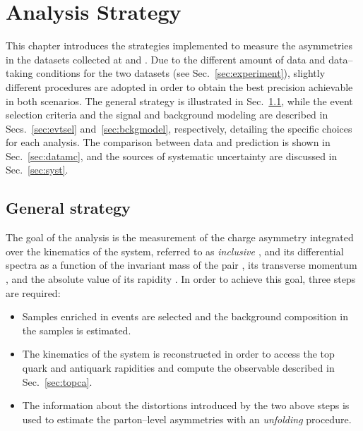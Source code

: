\chapter{Analysis Strategy}
\label{sec:strategy}

This chapter introduces the strategies implemented to measure the
asymmetries in the datasets collected at \seventev{} and \eighttev{}.
Due to the different amount of data and data--taking conditions for
the two datasets (see Sec.~\ref{sec:experiment}), slightly different
procedures are adopted in order to obtain the best precision
achievable in both scenarios. The general strategy is illustrated in
Sec.~\ref{sec:genstrategy}, while the event
selection criteria and the signal and background modeling are
described in Secs.~\ref{sec:evtsel} and~\ref{sec:bckgmodel},
respectively, detailing the specific choices for each analysis. The
comparison between data and prediction is shown in
Sec.~\ref{sec:datamc}, and the sources of systematic uncertainty are
discussed in Sec.~\ref{sec:syst}.

\section{General strategy}
\label{sec:genstrategy}

The goal of the analysis is the measurement of the charge asymmetry
\ac{} integrated over the kinematics of the \ttbar{} system,
referred to as {\it inclusive \ac{}}, and its differential spectra as
a function of the invariant mass of the \ttbar{} pair \mtt{}, its
transverse momentum \pttt{}, and the absolute value of its rapidity
\ytt{}. In order to achieve this goal, three steps are required:
\begin{itemize}
\item Samples enriched in \ttbar{} events are selected and the
  background composition in the samples is estimated.
\item The kinematics of the \ttbar{} system is reconstructed in order
  to access the top quark and antiquark rapidities and compute the
  \dy{} observable described in Sec.~\ref{sec:topca}.
\item The information about the distortions introduced by the two
  above steps is used to estimate the parton--level asymmetries with
  an {\it unfolding} procedure.
\end{itemize}

